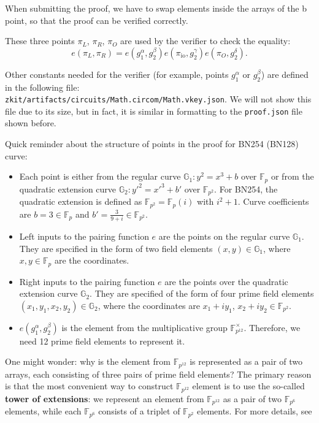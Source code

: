 \documentclass[../lecture-notes-105x135.tex]{subfiles}
\begin{document}
    \begin{remark}
        When submitting the proof, we have to swap elements inside the arrays of the b point, so that the proof can be verified correctly.
    \end{remark}

    These three points $\pi_L$, $\pi_R$, $\pi_O$ are used by the verifier to check the equality:
    \[
        e(\pi_L, \pi_R) = e(g_1^\alpha, g_2^\beta)e(\pi_{\text{io}},g_2^\gamma)e(\pi_O,g_2^\delta).
    \]

    Other constants needed for the verifier (for example, points $g_1^{\alpha}$ or $g_2^{\beta}$) are defined
    in the following file: \\ \texttt{zkit/artifacts/circuits/Math.circom/Math.vkey.json}. 
    We will not show this file due to its size, but in fact, it is similar in formatting to the \texttt{proof.json}
    file shown before.

    Quick reminder about the structure of points in the proof for BN254 (BN128) curve:
    \begin{itemize}
        \item Each point is either from the regular curve $\mathbb{G}_1: y^2=x^3+b$ over $\mathbb{F}_p$ or from the quadratic extension curve $\mathbb{G}_2: y'^2=x'^3+b'$ over $\mathbb{F}_{p^2}$. For BN254, the quadratic extension is defined as $\mathbb{F}_{p^2} = \mathbb{F}_p(i)$ with $i^2+1$. Curve coefficients are $b=3 \in \mathbb{F}_p$ and $b'=\frac{3}{9+i} \in \mathbb{F}_{p^2}$.
        \item Left inputs to the pairing function $e$ are the points on the regular curve $\mathbb{G}_1$. They are specified in the form of two field elements $(x,y) \in \mathbb{G}_1$, where $x, y \in \mathbb{F}_p$ are the coordinates.
        \item Right inputs to the pairing function $e$ are the points over the quadratic extension curve $\mathbb{G}_2$. They are specified of the form of four prime field elements $(x_{1}, y_{1}, x_{2}, y_2) \in \mathbb{G}_2$, where the coordinates are $x_1+iy_1$, $x_2+iy_2 \in \mathbb{F}_{p^2}$.
        \item $e(g_1^{\alpha}, g_2^{\beta})$ is the element from the multiplicative group $\mathbb{F}_{p^{12}}^{\times}$. Therefore, we need 12 prime field elements to represent it.
    \end{itemize}

    \begin{remark}
        One might wonder: why is the element from $\mathbb{F}_{p^{12}}$ is represented as a pair of two arrays,
        each consisting of three pairs of prime field elements? The primary reason is that the most convenient
        way to construct $\mathbb{F}_{p^{12}}$ element is to use the so-called \textbf{tower of extensions}: we represent
        an element from $\mathbb{F}_{p^{12}}$ as a pair of two $\mathbb{F}_{p^6}$ elements, while each $\mathbb{F}_{p^6}$
        consists of a triplet of $\mathbb{F}_{p^2}$ elements. For more details, see 
    \end{remark}
\end{document}
